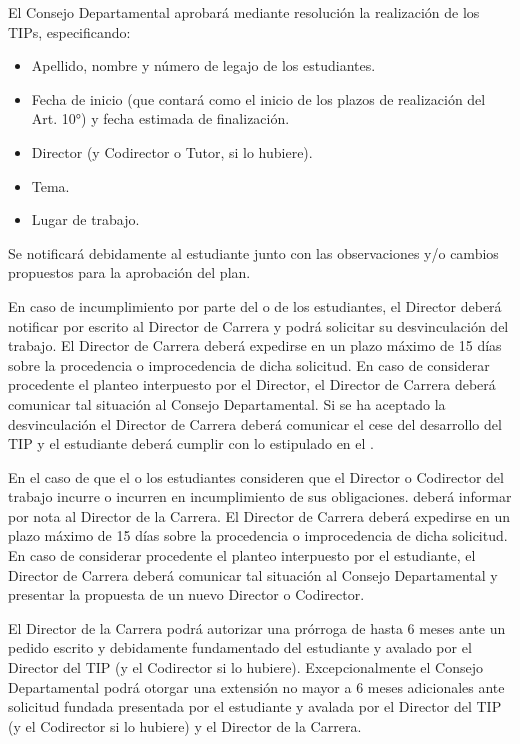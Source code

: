 \articulo El Consejo Departamental aprobará mediante resolución la
realización de los TIPs, especificando:
\begin{itemize}
 \item Apellido, nombre y número de legajo de los estudiantes.
 \item Fecha de inicio (que contará como el inicio de los plazos de
 realización del Art. 10°) y fecha estimada de finalización.
 \item Director (y Codirector o Tutor, si lo hubiere).
 \item Tema.
 \item Lugar de trabajo.
\end{itemize}

Se notificará debidamente al estudiante junto con las observaciones y/o cambios
propuestos para la aprobación del plan.


\articulo En caso de incumplimiento por parte del o de los estudiantes, el
Director deberá notificar por escrito al Director de Carrera y podrá solicitar su
desvinculación del trabajo. El Director de Carrera deberá expedirse en un plazo
máximo de 15 días sobre la procedencia o improcedencia de dicha solicitud. En caso
de considerar procedente el planteo interpuesto por el Director, el Director de Carrera
deberá comunicar tal situación al Consejo Departamental. Si se ha aceptado la
desvinculación el Director de Carrera deberá comunicar el cese del desarrollo del TIP
y el estudiante deberá cumplir con lo estipulado en el \artFinalizado.

\articulo En el caso de que el o los estudiantes consideren que el Director
o Codirector del trabajo incurre o incurren en incumplimiento de sus obligaciones.
deberá informar por nota al Director de la Carrera. El Director de Carrera deberá
expedirse en un plazo máximo de 15 días sobre la procedencia o improcedencia de
dicha solicitud. En caso de considerar procedente el planteo interpuesto por el
estudiante, el Director de Carrera deberá comunicar tal situación al Consejo
Departamental y presentar la propuesta de un nuevo Director o Codirector. 

\articulo {} El Director de la Carrera podrá autorizar una
prórroga de hasta 6 meses ante un pedido escrito y debidamente fundamentado del estudiante y avalado
por el Director del TIP (y el Codirector si lo hubiere). Excepcionalmente el Consejo
Departamental podrá otorgar una extensión no mayor a 6 meses adicionales ante
solicitud fundada presentada por el estudiante y avalada por el Director del TIP (y el
Codirector si lo hubiere) y el Director de la Carrera. 

